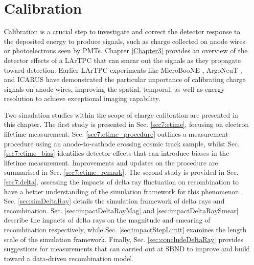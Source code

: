 
\chapter{Calibration}
\label{ChapterCalib}
\ifpdf
    \graphicspath{{Chapter8/Figs/Raster/}{Chapter8/Figs/PDF/}{Chapter8/Figs/}}
\else
    \graphicspath{{Chapter8/Figs/Vector/}{Chapter8/Figs/}}
\fi

Calibration is a crucial step to investigate and correct the detector response to the deposited energy to produce signals, such as charge collected on anode wires or photoelectrons seen by PMTs.
Chapter \ref{Chapter3} provides an overview of the detector effects of a LArTPC that can smear out the signals as they propagate toward detection.
Earlier LArTPC experiments like MicroBooNE \cite{uboone_calib, ubooneEtime}, ArgoNeuT \cite{argoneut_recomb}, and ICARUS \cite{icarus_recomb, GrayDiffusion} have demonstrated the particular importance of calibrating charge signals on anode wires, improving the spatial, temporal, as well as energy resolution to achieve exceptional imaging capability.

Two simulation studies within the scope of charge calibration are presented in this chapter.
The first study is presented in Sec. \ref{sec7:etime}, focusing on electron lifetime measurement.
Sec. \ref{sec7:etime_procedure} outlines a measurement procedure using an anode-to-cathode crossing cosmic track sample, whilst Sec. \ref{sec7:etime_bias} identifies detector effects that can introduce biases in the lifetime measurement.
Improvements and updates on the procedure are summarised in Sec. \ref{sec7:etime_remark}.
The second study is provided in Sec. \ref{sec7:delta}, assessing the impacts of delta ray fluctuation on recombination to have a better understanding of the simulation framework for this phenomenon.
Sec. \ref{sec:simDeltaRay} details the simulation framework of delta rays and recombination.
Sec. \ref{sec:impactDeltaRayMag} and \ref{sec:impactDeltaRaySmear} describe the impacts of delta rays on the magnitude and smearing of recombination respectively, while Sec. \ref{sec:impactStepLimit} examines the length scale of the simulation framework.
Finally, Sec. \ref{sec:concludeDeltaRay} provides suggestions for measurements that can carried out at SBND to improve and build toward a data-driven recombination model.

